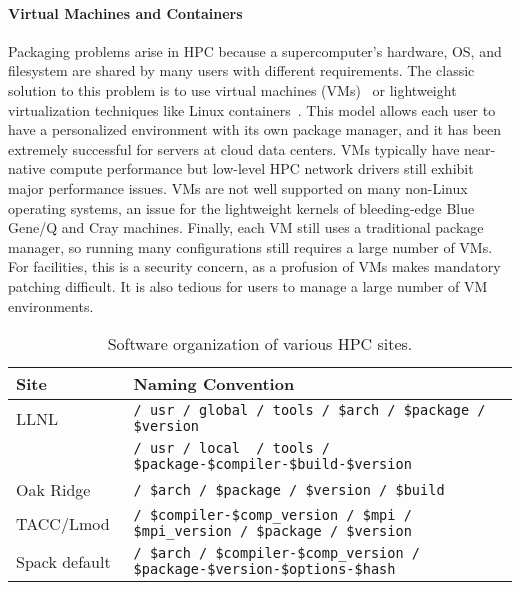 \paragraph{Virtual Machines and Containers}

Packaging problems arise in HPC because a supercomputer's hardware, OS, and
filesystem are shared by many users with different requirements.  The classic
solution to this problem is to use virtual
machines (VMs)~\cite{barham2003xen,rosenblum1999vmware,smith2005architecture}
or lightweight virtualization techniques like Linux
containers~\cite{felter2014updated,merkel2014docker}. This model allows each
 user to have a personalized environment with its own package manager, and it
has been extremely successful for servers at cloud data centers. VMs typically
have near-native compute performance but low-level HPC network drivers still
exhibit major performance issues. VMs are not well supported on many
non-Linux operating systems, an issue for the lightweight
kernels of bleeding-edge Blue Gene/Q and Cray machines.
Finally, each VM still uses a traditional package manager,
so running many configurations still requires a large number of VMs.
For facilities, this is a security concern, as a profusion of VMs makes
mandatory patching difficult.  It is also tedious for users to manage a large
number of VM environments.

\begin{table*}\centering
\begin{tabular}{|l|l|}
\hline
Site           & Naming Convention \\
\hline
\hline
LLNL       & {\tt / usr / global / tools / \$arch / \$package / \$version} \\
           & {\tt / usr / local~ / tools / \$package-\$compiler-\$build-\$version } \\
\hline
Oak Ridge~\cite{jones+:cug08}  & {\tt / \$arch / \$package / \$version / \$build} \\
\hline
TACC/Lmod~\cite{mclay:lmod-tutorial}& {\tt / \$compiler-\$comp\_version / \$mpi / \$mpi\_version / \$package / \$version} \\
\hline
\hline
Spack default                  & {\tt / \$arch / \$compiler-\$comp\_version / \$package-\$version-\$options-\$hash} \\
\hline
\end{tabular}
\caption{
	Software organization of various HPC sites.
	\label{tab:naming-conventions}
}
\end{table*}

